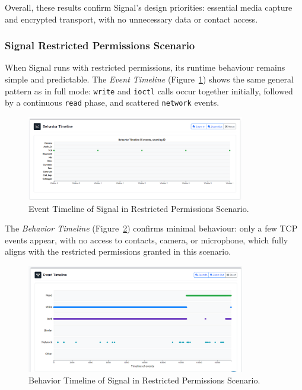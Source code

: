 \documentclass[a4paper,12pt]{report}
\begin{document}
Overall, these results confirm Signal’s design priorities: essential media capture and encrypted transport, with no unnecessary data or contact access.

\subsubsection{Signal Restricted Permissions Scenario}

When Signal runs with restricted permissions, its runtime behaviour remains simple and predictable. The \textit{Event Timeline} (Figure~\ref{fig:signal-none-events}) shows the same general pattern as in full mode: \texttt{write} and \texttt{ioctl} calls occur together initially, followed by a continuous \texttt{read} phase, and scattered \texttt{network} events.

\begin{figure}[H]
    \centering
    \includegraphics[width=0.85\textwidth]{signal-none-events.png}
    \caption{Event Timeline of Signal in Restricted Permissions Scenario.}
    \label{fig:signal-none-events}
\end{figure}

The \textit{Behavior Timeline} (Figure~\ref{fig:signal-none-behav}) confirms minimal behaviour: only a few TCP events appear, with no access to contacts, camera, or microphone, which fully aligns with the restricted permissions granted in this scenario.

\begin{figure}[H]
    \centering
    \includegraphics[width=0.85\textwidth]{signal-none-behav.png}
    \caption{Behavior Timeline of Signal in Restricted Permissions Scenario.}
    \label{fig:signal-none-behav}
\end{figure}
\end{document}
